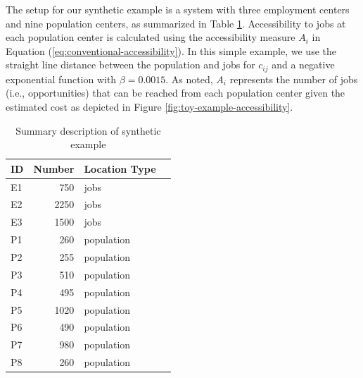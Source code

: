 \documentclass[]{elsarticle} %
\begin{document}
The setup for our synthetic example is a system with three employment
centers and nine population centers, as summarized in Table
\ref{tab:toy-example}. Accessibility to jobs at each population center
is calculated using the accessibility measure \(A_i\) in Equation
(\ref{eq:conventional-accessibility}). In this simple example, we use
the straight line distance between the population and jobs for
\(c_{ij}\) and a negative exponential function with \(\beta = 0.0015\).
As noted, \(A_i\) represents the number of jobs (i.e., opportunities)
that can be reached from each population center given the estimated cost
as depicted in Figure \ref{fig:toy-example-accessibility}.

\begin{table}

\caption{\label{tab:toy-example-table}\label{tab:toy-example}Summary description of synthetic example}
\centering
\begin{tabular}[t]{lrl>{}l}
\toprule
ID & Number & Location Type &  \\
\midrule
E1 & 750 & jobs & \\

E2 & 2250 & jobs & \\

E3 & 1500 & jobs & \\

P1 & 260 & population & \\

P2 & 255 & population & \\

P3 & 510 & population & \\

P4 & 495 & population & \\

P5 & 1020 & population & \\

P6 & 490 & population & \\

P7 & 980 & population & \\

P8 & 260 & population & \\


\end{tabular}
\end{table}
\end{document}
